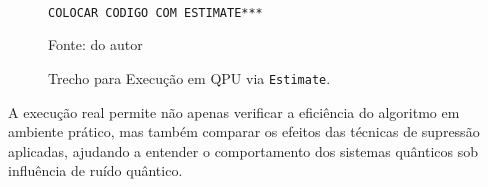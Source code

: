 \begin{figure}[!htb]
\centering
\caption{Trecho para Execução em QPU via \texttt{Estimate}.} 
\begin{verbatim}

COLOCAR CODIGO COM ESTIMATE***

\end{verbatim}
{\small Fonte: do autor} 
\label{cod: execucaoEstimate} 
\end{figure}

A execução real permite não apenas verificar a eficiência do algoritmo em ambiente prático, mas também comparar os efeitos das técnicas de supressão aplicadas, ajudando a entender o comportamento dos sistemas quânticos sob influência de ruído quântico.


